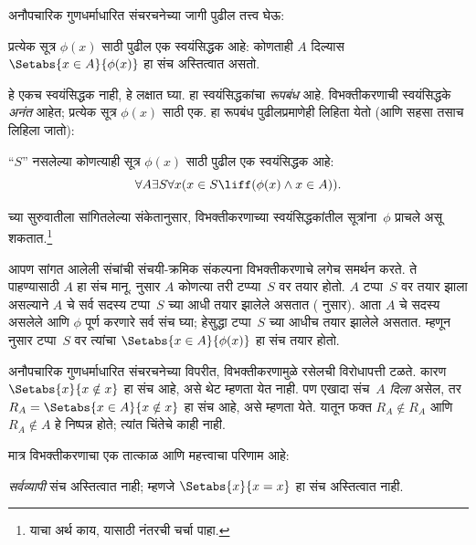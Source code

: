 \documentclass[../../../include/open-logic-section]{subfiles}
\begin{document}

अनौपचारिक गुणधर्माधारित संचरचनेच्या जागी पुढील तत्त्व घेऊ:

\begin{axiom}[विभक्तीकरण-रूपबंध] प्रत्येक सूत्र $\phi(x)$ साठी पुढील एक स्वयंसिद्धक आहे: कोणताही $A$ दिल्यास $\Setabs{x \in A}{\phi(x)}$ हा संच अस्तित्वात असतो.
\end{axiom}

हे एकच स्वयंसिद्धक नाही, हे लक्षात घ्या. हा स्वयंसिद्धकांचा \emph{रूपबंध} आहे. विभक्तीकरणाची स्वयंसिद्धके \emph{अनंत} आहेत; प्रत्येक सूत्र $\phi(x)$ साठी एक. हा रूपबंध पुढीलप्रमाणेही लिहिता येतो (आणि सहसा तसाच लिहिला जातो):

\begin{defish}
``$S$'' नसलेल्या कोणत्याही सूत्र $\phi(x)$ साठी पुढील एक स्वयंसिद्धक आहे:
\[
	\forall A \exists S \forall x(x \in S \liff (\phi(x) \land x \in A)).
\]
\end{defish}

 च्या सुरुवातीला सांगितलेल्या संकेतानुसार, विभक्तीकरणाच्या स्वयंसिद्धकांतील सूत्रांना~$\phi$ प्राचले असू शकतात.\footnote{याचा अर्थ काय, यासाठी  नंतरची चर्चा पाहा.}

आपण सांगत आलेली संचांची संचयी-क्रमिक संकल्पना विभक्तीकरणाचे लगेच समर्थन करते. ते पाहण्यासाठी $A$ हा संच मानू. \stageshier{} नुसार $A$ कोणत्या तरी टप्प्या~$S$ वर तयार होतो. $A$ टप्पा~$S$ वर तयार झाला असल्याने $A$ चे सर्व सदस्य टप्पा~$S$ च्या आधी तयार झालेले असतात (\stagesacc{} नुसार). आता $A$ चे सदस्य असलेले आणि $\phi$ पूर्ण करणारे सर्व संच घ्या; हेसुद्धा टप्पा~$S$ च्या आधीच तयार झालेले असतात. म्हणून \stagesacc{} नुसार टप्पा~$S$ वर त्यांचा $\Setabs{x \in A}{\phi(x)}$ हा संच तयार होतो.

अनौपचारिक गुणधर्माधारित संचरचनेच्या विपरीत, विभक्तीकरणामुळे रसेलची विरोधापत्ती टळते. कारण $\Setabs{x}{x \notin
x}$ हा संच आहे, असे थेट म्हणता येत नाही. पण एखादा संच~$A$ \emph{दिला} असेल, तर $R_A = \Setabs{x \in A}{x \notin x}$ हा संच आहे, असे म्हणता येते. यातून फक्त $R_A \notin R_A$ आणि $R_A \notin A$ हे निष्पन्न होते; त्यांत चिंतेचे काही नाही.

मात्र विभक्तीकरणाचा एक तात्काळ आणि महत्त्वाचा परिणाम आहे:

\begin{thm}
\emph{सर्वव्यापी} संच अस्तित्वात नाही; म्हणजे $\Setabs{x}{x = x}$ हा संच अस्तित्वात नाही.
\end{thm}
\end{document}
